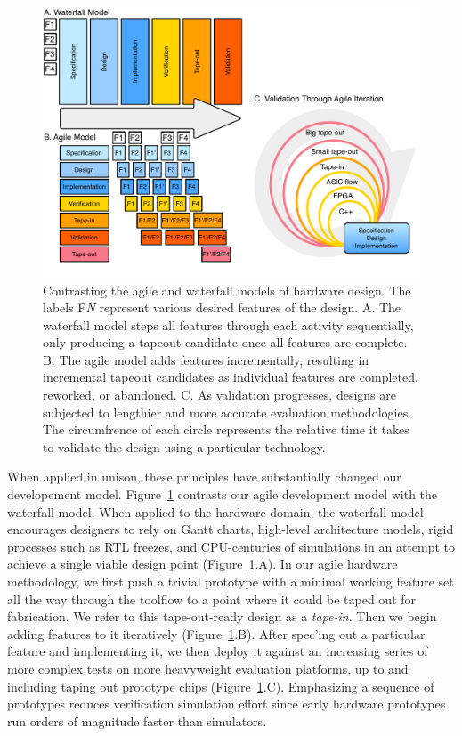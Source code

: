 \begin{figure}[t!]
\centering
\includegraphics[width=1\columnwidth]{intro/figures/agile.pdf}
\caption{
Contrasting the agile and waterfall models of hardware design.  The labels F{\em N} represent various desired features of the design.
A. The waterfall model steps all features through each activity
sequentially, only producing a tapeout candidate once all features are complete.
B. The agile model adds features incrementally, resulting in incremental tapeout candidates as individual features are
completed, reworked, or abandoned.
C. As validation progresses, designs are subjected to lengthier and more accurate evaluation methodologies.
The circumfrence of each circle represents the relative time it takes to validate the design using a particular technology.
}
\label{fig:agile}
\end{figure}

When applied in unison, these principles have substantially changed our developement model.
Figure~\ref{fig:agile} contrasts our agile development model with the waterfall model.
When applied to the hardware domain, the waterfall model encourages designers to rely on Gantt
charts, high-level architecture models, rigid processes such as RTL
freezes, and CPU-centuries of simulations in an attempt to achieve a
single viable design point (Figure~\ref{fig:agile}.A). 
In our agile hardware methodology, we first push a trivial prototype with a minimal working feature set all the way through the toolflow to a point where it could be taped out for fabrication.
We refer to this tape-out-ready design as a {\em tape-in}.
Then we begin adding features to it iteratively (Figure~\ref{fig:agile}.B).
After spec'ing out a particular feature and implementing it, 
we then deploy it against an increasing series of more complex tests on more heavyweight evaluation platforms, up to and including taping out prototype chips (Figure~\ref{fig:agile}.C).
Emphasizing a sequence of prototypes reduces verification simulation effort since early hardware prototypes run orders of magnitude faster than simulators. 

